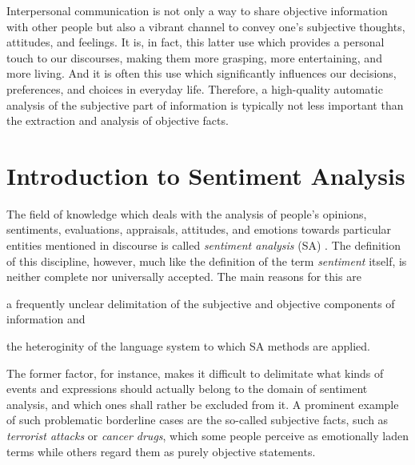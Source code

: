 

Interpersonal communication is not only a way to share objective
information with other people but also a vibrant channel to convey
one's subjective thoughts, attitudes, and feelings.  It is, in fact,
this latter use which provides a personal touch to our discourses,
making them more grasping, more entertaining, and more living.  And it
is often this use which significantly influences our decisions,
preferences, and choices in everyday life.  Therefore, a high-quality
automatic analysis of the subjective part of information is typically
not less important than the extraction and analysis of objective
facts.

\section{Introduction to Sentiment Analysis}

The field of knowledge which deals with the analysis of people's
opinions, sentiments, evaluations, appraisals, attitudes, and emotions
towards particular entities mentioned in discourse is called
\emph{sentiment analysis} (SA) \citep{Liu:12}.  The definition of this
discipline, however, much like the definition of the term
\emph{sentiment} itself, is neither complete nor universally accepted.
The main reasons for this are
\begin{inparaenum}
  \item a frequently unclear delimitation of the subjective and
    objective components of information and
  \item the heteroginity of the language system to which SA methods
    are applied.
\end{inparaenum}

The former factor, for instance, makes it difficult to delimitate what
kinds of events and expressions should actually belong to the domain
of sentiment analysis, and which ones shall rather be excluded from
it.  A prominent example of such problematic borderline cases are the
so-called subjective facts, such as \emph{terrorist attacks} or
\emph{cancer drugs}, which some people perceive as emotionally laden
terms while others regard them as purely objective statements.

